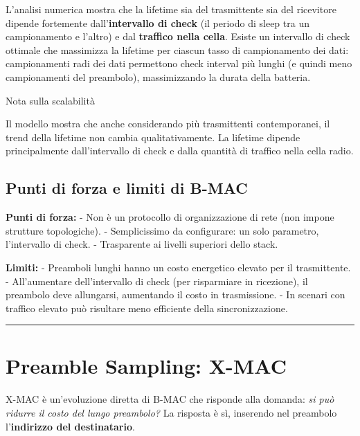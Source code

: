 \documentclass[
  italian,
  openany]{book}
\begin{document}
L'analisi numerica mostra che la lifetime sia del trasmittente sia del
ricevitore dipende fortemente dall'\textbf{intervallo di check} (il
periodo di sleep tra un campionamento e l'altro) e dal \textbf{traffico
nella cella}. Esiste un intervallo di check ottimale che massimizza la
lifetime per ciascun tasso di campionamento dei dati: campionamenti radi
dei dati permettono check interval più lunghi (e quindi meno
campionamenti del preambolo), massimizzando la durata della batteria.

\begin{calloutnote}{Nota sulla scalabilità}

Il modello mostra che anche considerando più trasmittenti contemporanei,
il trend della lifetime non cambia qualitativamente. La lifetime dipende
principalmente dall'intervallo di check e dalla quantità di traffico
nella cella radio.

\end{calloutnote}

\subsection{Punti di forza e limiti di
B-MAC}\label{punti-di-forza-e-limiti-di-b-mac}

\textbf{Punti di forza:} - Non è un protocollo di organizzazione di rete
(non impone strutture topologiche). - Semplicissimo da configurare: un
solo parametro, l'intervallo di check. - Trasparente ai livelli
superiori dello stack.

\textbf{Limiti:} - Preamboli lunghi hanno un costo energetico elevato
per il trasmittente. - All'aumentare dell'intervallo di check (per
risparmiare in ricezione), il preambolo deve allungarsi, aumentando il
costo in trasmissione. - In scenari con traffico elevato può risultare
meno efficiente della sincronizzazione.

\begin{center}\rule{0.5\linewidth}{0.5pt}\end{center}

\section{Preamble Sampling: X-MAC}\label{preamble-sampling-x-mac}

X-MAC è un'evoluzione diretta di B-MAC che risponde alla domanda:
\emph{si può ridurre il costo del lungo preambolo?} La risposta è sì,
inserendo nel preambolo l'\textbf{indirizzo del destinatario}.
\end{document}
